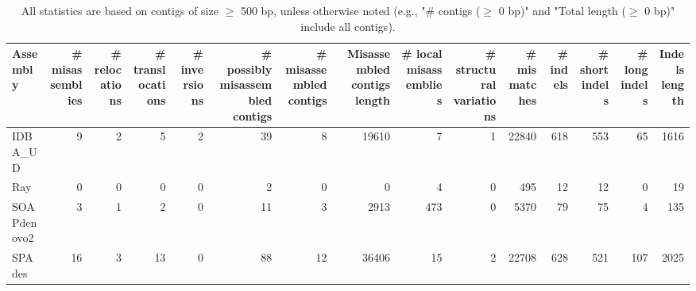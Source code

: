 \documentclass[12pt,a4paper]{article}
\begin{document}
\begin{table}[ht]
\begin{center}
\caption{All statistics are based on contigs of size $\geq$ 500 bp, unless otherwise noted (e.g., "\# contigs ($\geq$ 0 bp)" and "Total length ($\geq$ 0 bp)" include all contigs).}
\begin{tabular}{|l*{14}{|r}|}
\hline
Assembly & \# misassemblies &     \# relocations &     \# translocations &     \# inversions & \# possibly misassembled contigs & \# misassembled contigs & Misassembled contigs length & \# local misassemblies & \# structural variations & \# mismatches & \# indels &     \# short indels &     \# long indels & Indels length \\ \hline
IDBA\_UD & 9 & 2 & 5 & 2 & 39 & 8 & 19610 & 7 & 1 & 22840 & 618 & 553 & 65 & 1616 \\ \hline
Ray & 0 & 0 & 0 & 0 & 2 & 0 & 0 & 4 & 0 & 495 & 12 & 12 & 0 & 19 \\ \hline
SOAPdenovo2 & 3 & 1 & 2 & 0 & 11 & 3 & 2913 & 473 & 0 & 5370 & 79 & 75 & 4 & 135 \\ \hline
SPAdes & 16 & 3 & 13 & 0 & 88 & 12 & 36406 & 15 & 2 & 22708 & 628 & 521 & 107 & 2025 \\ \hline
\end{tabular}
\end{center}
\end{table}
\end{document}
